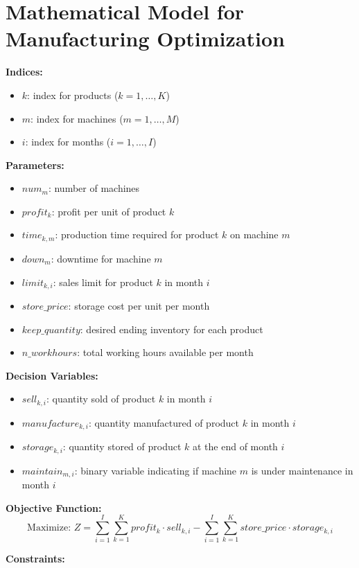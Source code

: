 \documentclass{article}
\begin{document}
\section*{Mathematical Model for Manufacturing Optimization}

\textbf{Indices:}
\begin{itemize}
    \item $k$: index for products ($k = 1, \ldots, K$)
    \item $m$: index for machines ($m = 1, \ldots, M$)
    \item $i$: index for months ($i = 1, \ldots, I$)
\end{itemize}

\textbf{Parameters:}
\begin{itemize}
    \item $num_{m}$: number of machines
    \item $profit_{k}$: profit per unit of product $k$
    \item $time_{k, m}$: production time required for product $k$ on machine $m$
    \item $down_{m}$: downtime for machine $m$ 
    \item $limit_{k, i}$: sales limit for product $k$ in month $i$
    \item $store\_price$: storage cost per unit per month
    \item $keep\_quantity$: desired ending inventory for each product
    \item $n\_workhours$: total working hours available per month
\end{itemize}

\textbf{Decision Variables:}
\begin{itemize}
    \item $sell_{k, i}$: quantity sold of product $k$ in month $i$
    \item $manufacture_{k, i}$: quantity manufactured of product $k$ in month $i$
    \item $storage_{k, i}$: quantity stored of product $k$ at the end of month $i$
    \item $maintain_{m, i}$: binary variable indicating if machine $m$ is under maintenance in month $i$
\end{itemize}

\textbf{Objective Function:}
\[
\text{Maximize: } Z = \sum_{i=1}^{I} \sum_{k=1}^{K} profit_{k} \cdot sell_{k, i} - \sum_{i=1}^{I} \sum_{k=1}^{K} store\_price \cdot storage_{k, i}
\]

\textbf{Constraints:}
\end{document}
